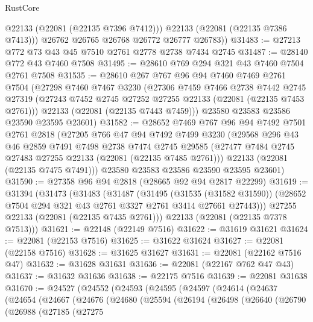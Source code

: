 \begin{lexlean}{RustCore}
\begin{coremodule}
            @22133
            (@22081 (@22135 @7396 @7412)))
          @22133
          (@22081 (@22135 @7386 @7413)))
        @26762
        @26765
        @26768
        @26772
        @26777
        @26783))
@31483 := @27213 @772 @73 @43 @45 @7510 @2761 @2778 @2738 @7434 @2745
@31487 := @28140 @772 @43 @7460 @7508
@31495 := @28610 @769 @294 @321 @43 @7460 @7504 @2761 @7508
@31535 := @28610
    @267
    @767
    @96
    @94
    @7460
    @7469
    @2761
    @7504
    (@27298
      @7460
      @7467
      @3230
      (@27306
        @7459
        @7466
        @2738
        @7442
        @2745
        @27319
        (@27243 @7452 @2745 @27252 @27255 @22133 (@22081 (@22135 @7453 @2761)))
        @22133
        (@22081 (@22135 @7443 @7459)))
      @23580
      @23583
      @23586
      @23590
      @23595
      @23601)
@31582 := @28652
    @7469
    @767
    @96
    @94
    @7492
    @7501
    @2761
    @2818
    (@27205
      @766
      @47
      @94
      @7492
      @7499
      @3230
      (@29568
        @296
        @43
        @46
        @2859
        @7491
        @7498
        @2738
        @7474
        @2745
        @29585
        (@27477 @7484 @2745 @27483 @27255 @22133 (@22081 (@22135 @7485 @2761)))
        @22133
        (@22081 (@22135 @7475 @7491)))
      @23580
      @23583
      @23586
      @23590
      @23595
      @23601)
@31590 := @27358 @96 @94 @2818 (@28665 @92 @94 @2817 @22299)
@31619 := @31394
    (@31473
      (@31483
        (@31487
          (@31495
            (@31535 (@31582 @31590))
            (@28652 @7504 @294 @321 @43 @2761 @3327 @2761 @3414 @27661 @27443)))
        @27255
        @22133
        (@22081 (@22135 @7435 @2761)))
      @22133
      (@22081 (@22135 @7378 @7513)))
@31621 := @22148 (@22149 @7516)
@31622 := @31619 @31621
@31624 := @22081 (@22153 @7516)
@31625 := @31622 @31624
@31627 := @22081 (@22158 @7516)
@31628 := @31625 @31627
@31631 := @22081 (@22162 @7516 @47)
@31632 := @31628 @31631
@31636 := @22081 (@22167 @762 @47 @43)
@31637 := @31632 @31636
@31638 := @22175 @7516
@31639 := @22081 @31638
@31670 := @24527
    (@24552
      (@24593
        (@24595
          (@24597
            (@24614
              (@24637
                (@24654
                  (@24667
                    (@24676
                      (@24680
                        (@25594
                          (@26194
                            (@26498
                              (@26640
                                (@26790
                                  (@26988
                                    (@27185
                                      (@27275

\end{coremodule}
\end{lexlean}
